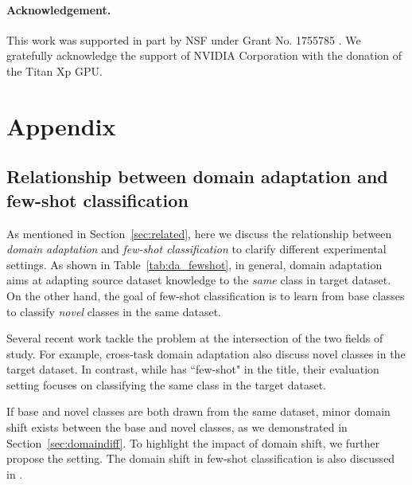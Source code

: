 \documentclass{article}
\newcommand{\secref}[1]{Section~\ref{sec:#1}}
\newcommand{\tabref}[1]{Table~\ref{tab:#1}}
\begin{document}
 \paragraph{Acknowledgement.} 

 This work was supported in part by NSF under Grant No. 1755785 . We gratefully acknowledge the support of NVIDIA Corporation with the donation of the Titan Xp GPU. 




\newpage
\setcounter{table}{0}
\setcounter{figure}{0}
\renewcommand{\thetable}{A\arabic{table}}
\renewcommand{\thefigure}{A\arabic{figure}}
\renewcommand{\thesubsection}{A\arabic{subsection}}

\section*{Appendix}
\subsection{Relationship between domain adaptation and few-shot classification}
As mentioned in \secref{related}, here we discuss the relationship between \emph{domain adaptation} and \emph{few-shot classification} to clarify different experimental settings. As shown in \tabref{da_fewshot}, in general, domain adaptation aims at adapting source dataset knowledge to the \emph{same} class in target dataset.
On the other hand, the goal of few-shot classification is to learn from base classes to classify \emph{novel} classes in the same dataset.

Several recent work tackle the problem at the intersection of the two fields of study. For example, cross-task domain adaptation \cite{hsu2017learning} also discuss novel classes in the target dataset. In contrast, while \cite{motiian2017few} has ``few-shot" in the title, their evaluation setting focuses on classifying the same class in the target dataset. 

If base and novel classes are both drawn from the same dataset, minor domain shift exists between the base and novel classes, as we demonstrated in \secref{domaindiff}. To highlight the impact of domain shift, we further propose the  \miniICUB setting. The domain shift in few-shot classification is also discussed in \cite{dong2018domain}.
\end{document}
